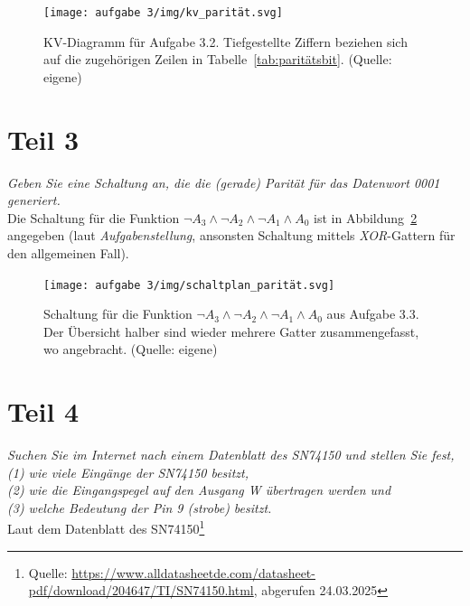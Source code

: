 \begin{figure}
    \centering
    \texttt{[image: aufgabe 3/img/kv\_parität.svg]}
    \caption{KV-Diagramm für Aufgabe 3.2. Tiefgestellte Ziffern beziehen sich auf die zugehörigen Zeilen in Tabelle~\ref{tab:paritätsbit}. (Quelle: eigene)}
    \label{fig:kv_parität}
\end{figure}

\section{Teil 3}

\textit{Geben Sie eine Schaltung an, die die (gerade) Parität für das Datenwort  0001 generiert.}\\

\noindent
Die Schaltung für die Funktion $\neg A_3 \land \neg A_2 \land \neg A_1 \land A_0$ ist in Abbildung~\ref{fig:schaltplan_parität} angegeben (laut \textit{Aufgabenstellung}, ansonsten Schaltung mittels \textit{XOR}-Gattern für den allgemeinen Fall).

\begin{figure}
    \centering
    \texttt{[image: aufgabe 3/img/schaltplan\_parität.svg]}
    \caption{Schaltung für die Funktion $\neg A_3 \land \neg A_2 \land \neg A_1 \land A_0$ aus Aufgabe 3.3. Der Übersicht halber sind wieder mehrere Gatter zusammengefasst, wo angebracht. (Quelle: eigene)}
    \label{fig:schaltplan_parität}
\end{figure}

\section{Teil 4}

\textit{Suchen Sie im Internet nach einem Datenblatt des SN74150 und stellen
Sie fest,\\
    (1) wie viele Eingänge der SN74150 besitzt,\\
    (2) wie die Eingangspegel auf den Ausgang W übertragen werden und\\
    (3) welche Bedeutung der Pin 9 (strobe) besitzt.
}\\

\noindent
Laut dem Datenblatt des SN74150\footnote{
    Quelle: \url{https://www.alldatasheetde.com/datasheet-pdf/download/204647/TI/SN74150.html}, abgerufen 24.03.2025
}

